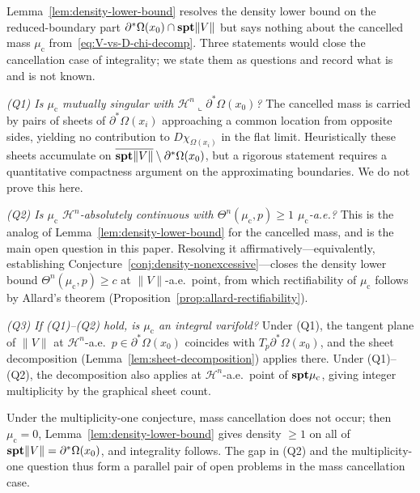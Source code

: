 \begin{remark}\label{rem:cancelled-mass-gap}
Lemma~\ref{lem:density-lower-bound} resolves the density lower bound on the reduced-boundary part $\partial^*\Omega(x_0) \cap \mathbf{spt}\|V\|$ but says nothing about the cancelled mass $\mu_{\mathrm{c}}$ from~\eqref{eq:V-vs-D-chi-decomp}. Three statements would close the cancellation case of integrality; we state them as questions and record what is and is not known.

\emph{(Q1) Is $\mu_{\mathrm{c}}$ mutually singular with $\mathcal{H}^n\llcorner\partial^*\Omega(x_0)$?}
The cancelled mass is carried by pairs of sheets of $\partial^*\Omega(x_i)$ approaching a common location from opposite sides, yielding no contribution to $D\chi_{\Omega(x_i)}$ in the flat limit. Heuristically these sheets accumulate on $\overline{\mathbf{spt}\|V\|} \setminus \partial^*\Omega(x_0)$, but a rigorous statement requires a quantitative compactness argument on the approximating boundaries. We do not prove this here.

\emph{(Q2) Is $\mu_{\mathrm{c}}$ $\mathcal{H}^n$-absolutely continuous with $\Theta^n(\mu_{\mathrm{c}}, p) \geq 1$ $\mu_{\mathrm{c}}$-a.e.?}
This is the analog of Lemma~\ref{lem:density-lower-bound} for the cancelled mass, and is the main open question in this paper. Resolving it affirmatively---equivalently, establishing Conjecture~\ref{conj:density-nonexcessive}---closes the density lower bound $\Theta^n(\mu_{\mathrm{c}}, p) \geq c$ at $\|V\|$-a.e.\ point, from which rectifiability of $\mu_{\mathrm{c}}$ follows by Allard's theorem (Proposition~\ref{prop:allard-rectifiability}).

\emph{(Q3) If (Q1)--(Q2) hold, is $\mu_{\mathrm{c}}$ an integral varifold?}
Under (Q1), the tangent plane of $\|V\|$ at $\mathcal{H}^n$-a.e.\ $p \in \partial^*\Omega(x_0)$ coincides with $T_p\partial^*\Omega(x_0)$, and the sheet decomposition (Lemma~\ref{lem:sheet-decomposition}) applies there. Under (Q1)--(Q2), the decomposition also applies at $\mathcal{H}^n$-a.e.\ point of $\mathbf{spt} \mu_{\mathrm{c}}$, giving integer multiplicity by the graphical sheet count.

Under the multiplicity-one conjecture, mass cancellation does not occur; then $\mu_{\mathrm{c}} = 0$, Lemma~\ref{lem:density-lower-bound} gives density $\geq 1$ on all of $\mathbf{spt}\|V\| = \partial^*\Omega(x_0)$, and integrality follows. The gap in (Q2) and the multiplicity-one question thus form a parallel pair of open problems in the mass cancellation case.
\end{remark}

